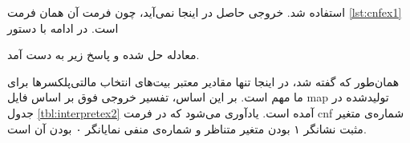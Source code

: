 \documentclass{article}
\begin{document}
\begin{flushleft}
\end{flushleft}

استفاده شد. خروجی حاصل در اینجا نمی‌آید، چون فرمت آن همان فرمت \ref{lst:cnfex1} است. در ادامه با دستور 

\begin{flushleft}
\end{flushleft}

معادله حل شده و پاسخ زیر به دست آمد.

\begin{LTR}{}\end{LTR}

همان‌طور که گفته شد، در اینجا تنها مقادیر معتبر بیت‌های انتخاب مالتی‌پلکسرها برای ما مهم است. بر این اساس، تفسیر خروجی فوق بر اساس فایل map تولیدشده در جدول \ref{tbl:interpretex2} آمده است. یادآوری می‌شود که در فرمت cnf شماره‌ی متغیر مثبت نشانگر ۱ بودن متغیر متناظر و شماره‌ی منفی نمایانگر ۰ بودن آن است. 

\end{document}
